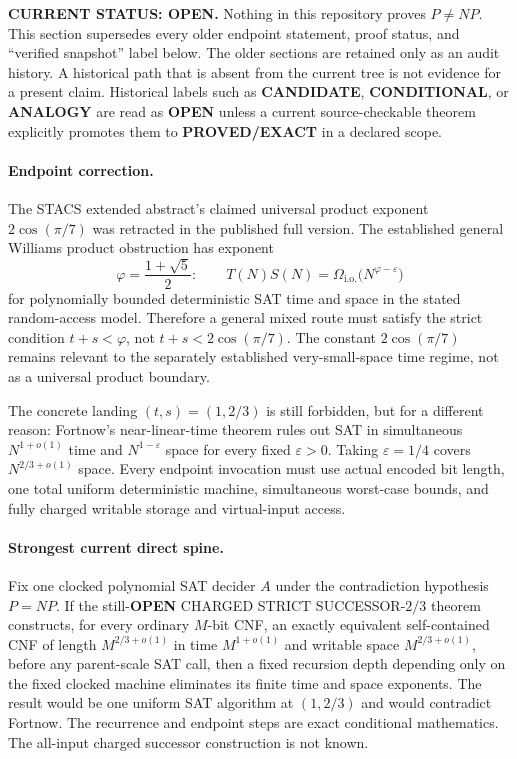 \documentclass[11pt]{article}
\begin{document}
\begin{warningbox}
\textbf{CURRENT STATUS: OPEN.}  Nothing in this repository proves
$P\ne NP$.  This section supersedes every older endpoint statement, proof
status, and ``verified snapshot'' label below.  The older sections are retained
only as an audit history.  A historical path that is absent from the current
tree is not evidence for a present claim.  Historical labels such as
\textbf{CANDIDATE}, \textbf{CONDITIONAL}, or \textbf{ANALOGY} are read as
\textbf{OPEN} unless a current source-checkable theorem explicitly promotes
them to \textbf{PROVED/EXACT} in a declared scope.
\end{warningbox}

\paragraph{Endpoint correction.}
The STACS extended abstract's claimed universal product exponent
$2\cos(\pi/7)$ was retracted in the published full version.  The established
general Williams product obstruction has exponent
\[
 \varphi=\frac{1+\sqrt5}{2}:
 \qquad T(N)S(N)=\Omega_{\mathrm{i.o.}}
       \bigl(N^{\varphi-\varepsilon}\bigr)
\]
for polynomially bounded deterministic SAT time and space in the stated
random-access model.  Therefore a general mixed route must satisfy the strict
condition $t+s<\varphi$, not $t+s<2\cos(\pi/7)$.  The constant
$2\cos(\pi/7)$ remains relevant to the separately established very-small-space
time regime, not as a universal product boundary.

The concrete landing $(t,s)=(1,2/3)$ is still forbidden, but for a different
reason: Fortnow's near-linear-time theorem rules out SAT in simultaneous
$N^{1+o(1)}$ time and $N^{1-\varepsilon}$ space for every fixed
$\varepsilon>0$.  Taking $\varepsilon=1/4$ covers
$N^{2/3+o(1)}$ space.  Every endpoint invocation must use actual encoded bit
length, one total uniform deterministic machine, simultaneous worst-case
bounds, and fully charged writable storage and virtual-input access.

\paragraph{Strongest current direct spine.}
Fix one clocked polynomial SAT decider $A$ under the contradiction hypothesis
$P=NP$.  If the still-\textbf{OPEN} CHARGED STRICT SUCCESSOR-$2/3$ theorem
constructs, for every ordinary $M$-bit CNF, an exactly equivalent
self-contained CNF of length $M^{2/3+o(1)}$ in time $M^{1+o(1)}$ and writable
space $M^{2/3+o(1)}$, before any parent-scale SAT call, then a fixed recursion
depth depending only on the fixed clocked machine eliminates its finite time
and space exponents.  The result would be one uniform SAT algorithm at
$(1,2/3)$ and would contradict Fortnow.  The recurrence and endpoint steps are
exact conditional mathematics.  The all-input charged successor construction
is not known.
\end{document}
